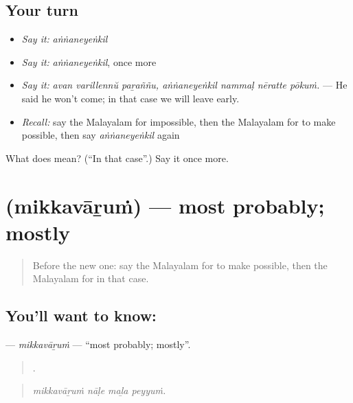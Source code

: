 \subsection*{Your turn}
\begin{itemize}
\raggedright
  \item \emph{Say it:} \emph{aṅṅaneyeṅkil}
  \item \emph{Say it:} \emph{aṅṅaneyeṅkil}, once more
  \item \emph{Say it:} \emph{avan varillennŭ paṟaññu, aṅṅaneyeṅkil nammaḷ nēratte pōkuṁ.} — He said he won't come; in that case we will leave early.
  \item \emph{Recall:} say the Malayalam for impossible, then the Malayalam for to make possible, then say \emph{aṅṅaneyeṅkil} again
\end{itemize}

\begin{tcolorbox}[breakable,colback=teal!4,colframe=teal!35!black,title={Before you move on}]
What does  mean? (\textquotedblleft{}In that case\textquotedblright{}.) Say it once more.
\end{tcolorbox}
\section[\texorpdfstring{\ml{മിക്കവാറും} (mikkavāṟuṁ)}{മിക്കവാറും (mikkavāṟuṁ)}]{ (mikkavāṟuṁ) — most probably; mostly}

\label{lesson:ML-C441-mikkavarum}



\begin{quote}
Before the new one: say the Malayalam for to make possible, then the Malayalam for in that case.
\end{quote}

\subsection*{You'll want to know: }
\textbf{} — \emph{mikkavāṟuṁ} — \textquotedblleft{}most probably; mostly\textquotedblright{}.

\begin{quote}
   .
\end{quote}

\begin{quote}
\emph{mikkavāṟuṁ nāḷe maḻa peyyuṁ.}
\end{quote}


